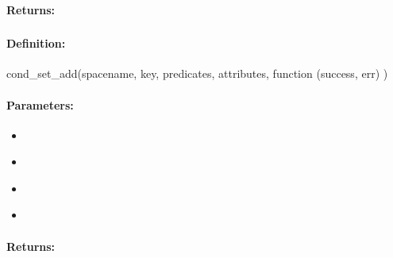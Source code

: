\paragraph{Returns:}


\pagebreak
\subsubsection{}
\label{api:nodejs:cond_set_add}


\paragraph{Definition:}
\begin{javascriptcode}
cond_set_add(spacename, key, predicates, attributes, function (success, err) {})
\end{javascriptcode}
\paragraph{Parameters:}
\begin{itemize}[noitemsep]
\item {}\\

\item {}\\

\item {}\\

\item {}\\

\end{itemize}

\paragraph{Returns:}


\pagebreak
\subsubsection{}
\label{api:nodejs:set_remove}


